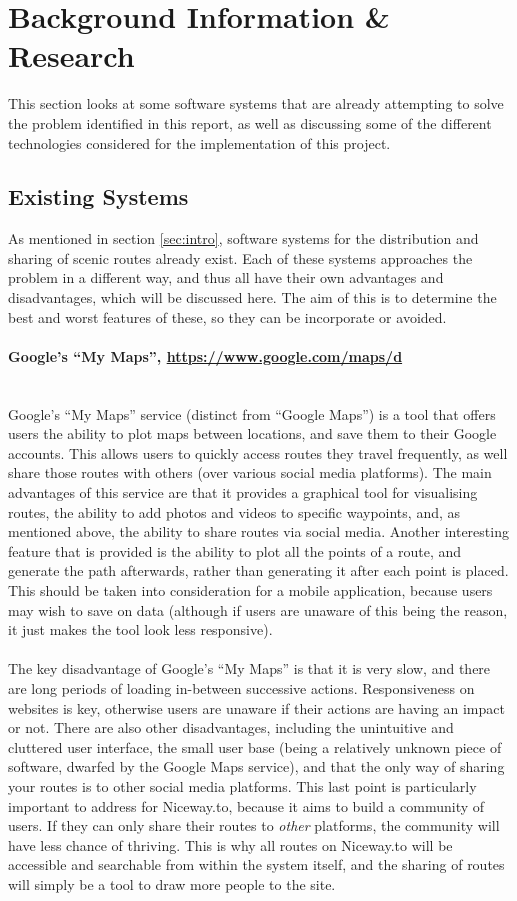 \section{Background Information \& Research}
This section looks at some software systems that are already attempting to solve the problem identified in this report, as well as discussing some of the different technologies considered for the implementation of this project.

\subsection{Existing Systems}
\label{sec:existing-systems}
As mentioned in section \ref{sec:intro}, software systems for the distribution and sharing of scenic routes already exist. Each of these systems approaches the problem in a different way, and thus all have their own advantages and disadvantages, which will be discussed here. The aim of this is to determine the best and worst features of these, so they can be incorporate or avoided.

\paragraph{Google's ``My Maps'', \url{https://www.google.com/maps/d}}\ \\
Google's ``My Maps'' service (distinct from ``Google Maps'') is a tool that offers users the ability to plot maps between locations, and save them to their Google accounts. This allows users to quickly access routes they travel frequently, as well share those routes with others (over various social media platforms). The main advantages of this service are that it provides a graphical tool for visualising routes, the ability to add photos and videos to specific waypoints, and, as mentioned above, the ability to share routes via social media. Another interesting feature that is provided is the ability to plot all the points of a route, and generate the path afterwards, rather than generating it after each point is placed. This should be taken into consideration for a mobile application, because users may wish to save on data (although if users are unaware of this being the reason, it just makes the tool look less responsive).\ \\
\ \\
The key disadvantage of Google's ``My Maps'' is that it is very slow, and there are long periods of loading in-between successive actions. Responsiveness on websites is key, otherwise users are unaware if their actions are having an impact or not. There are also other disadvantages, including the unintuitive and cluttered user interface, the small user base (being a relatively unknown piece of software, dwarfed by the Google Maps service), and that the only way of sharing your routes is to other social media platforms. This last point is particularly important to address for Niceway.to, because it aims to build a community of users. If they can only share their routes to \textit{other} platforms, the community will have less chance of thriving. This is why all routes on Niceway.to will be accessible and searchable from within the system itself, and the sharing of routes will simply be a tool to draw more people to the site.

